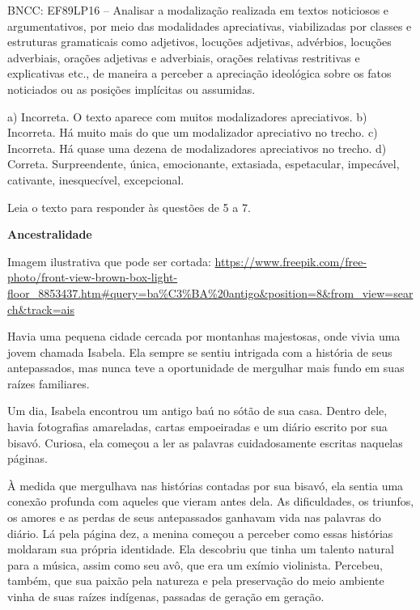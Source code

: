 \begin{itemize}
\begin{itemize}
\begin{escolha}
\begin{escolha}
\begin{escolha}
\begin{escolha}
\begin{escolha}
\begin{escolha}
\begin{escolha}
\begin{escolha}
\begin{escolha}
\begin{escolha}
\begin{escolha}
\begin{escolha}
BNCC: EF89LP16 -- Analisar a modalização realizada em textos noticiosos
e argumentativos, por meio das modalidades apreciativas, viabilizadas
por classes e estruturas gramaticais como adjetivos, locuções adjetivas,
advérbios, locuções adverbiais, orações adjetivas e adverbiais, orações
relativas restritivas e explicativas etc., de maneira a perceber a
apreciação ideológica sobre os fatos noticiados ou as posições
implícitas ou assumidas.

a) Incorreta. O texto aparece com muitos modalizadores apreciativos. b)
Incorreta. Há muito mais do que um modalizador apreciativo no trecho. c)
Incorreta. Há quase uma dezena de modalizadores apreciativos no trecho.
d) Correta. Surpreendente, única, emocionante, extasiada, espetacular,
impecável, cativante, inesquecível, excepcional.

Leia o texto para responder às questões de 5 a 7.

\textbf{Ancestralidade}

Imagem ilustrativa que pode ser cortada:
\url{https://www.freepik.com/free-photo/front-view-brown-box-light-floor_8853437.htm\#query=ba\%C3\%BA\%20antigo\&position=8\&from_view=search\&track=ais}

Havia uma pequena cidade cercada por montanhas majestosas, onde vivia
uma jovem chamada Isabela. Ela sempre se sentiu intrigada com a história
de seus antepassados, mas nunca teve a oportunidade de mergulhar mais
fundo em suas raízes familiares.

Um dia, Isabela encontrou um antigo baú no sótão de sua casa. Dentro
dele, havia fotografias amareladas, cartas empoeiradas e um diário
escrito por sua bisavó. Curiosa, ela começou a ler as palavras
cuidadosamente escritas naquelas páginas.

À medida que mergulhava nas histórias contadas por sua bisavó, ela
sentia uma conexão profunda com aqueles que vieram antes dela. As
dificuldades, os triunfos, os amores e as perdas de seus antepassados
ganhavam vida nas palavras do diário. Lá pela página dez, a menina
começou a perceber como essas histórias moldaram sua própria identidade.
Ela descobriu que tinha um talento natural para a música, assim como seu
avô, que era um exímio violinista. Percebeu, também, que sua paixão pela
natureza e pela preservação do meio ambiente vinha de suas raízes
indígenas, passadas de geração em geração.


\end{escolha}
\end{escolha}
\end{escolha}
\end{escolha}
\end{escolha}
\end{escolha}
\end{escolha}
\end{escolha}
\end{escolha}
\end{escolha}
\end{escolha}
\end{escolha}
\end{itemize}
\end{itemize}
